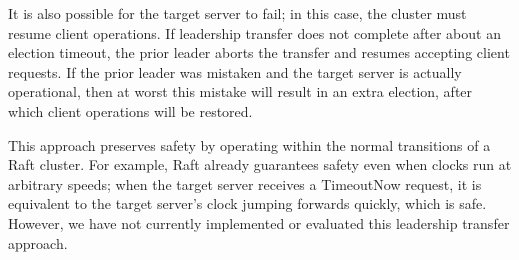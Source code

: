 It is also possible for the target server to fail; in this case, the
cluster must resume client operations. If leadership transfer does not
complete after about an election timeout, the prior leader aborts the
transfer and resumes accepting client requests. If the prior leader was
mistaken and the target server is actually operational, then at worst
this mistake will result in an extra election, after which client
operations will be restored.

This approach preserves safety by operating within the normal
transitions of a Raft cluster. For example, Raft already guarantees
safety even when clocks run at arbitrary speeds; when the target server
receives a TimeoutNow request, it is equivalent to the target server's
clock jumping forwards quickly, which is safe. However, we have not currently
implemented or evaluated this leadership transfer approach.
